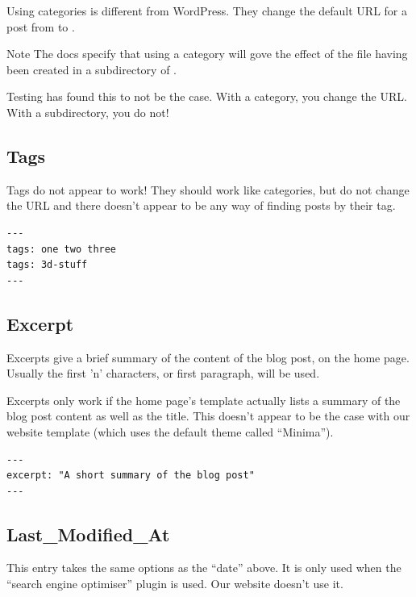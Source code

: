 Using categories is different from WordPress. They change the default URL for a post from  to .

\begin{tips}{Note}
    The docs specify that using a category will gove the effect of the file having been created in a subdirectory of .

    Testing has found this to not be the case. With a category, you change the URL. With a subdirectory, you do not!
\end{tips}

\subsection{Tags}

Tags do not appear to work! They should work like categories, but do not change the URL and there doesn't appear to be any way of finding posts by their tag.

\begin{lstlisting}[style=myText]
---
tags: one two three
tags: 3d-stuff
---
\end{lstlisting}


\subsection{Excerpt}

Excerpts give a brief summary of the content of the blog post, on the home page. Usually the first 'n' characters, or first paragraph, will be used.

Excerpts only work if the home page's template actually lists a summary of the blog post content as well as the title. This doesn't appear to be the case with our website template (which uses the default theme called ``Minima'').

\begin{lstlisting}[style=myText]
---
excerpt: "A short summary of the blog post"
---
\end{lstlisting}




\subsection{Last\_Modified\_At}

This entry takes the same options as the ``date'' above. It is only used when the ``search engine optimiser'' plugin is used. Our website doesn't use it.



